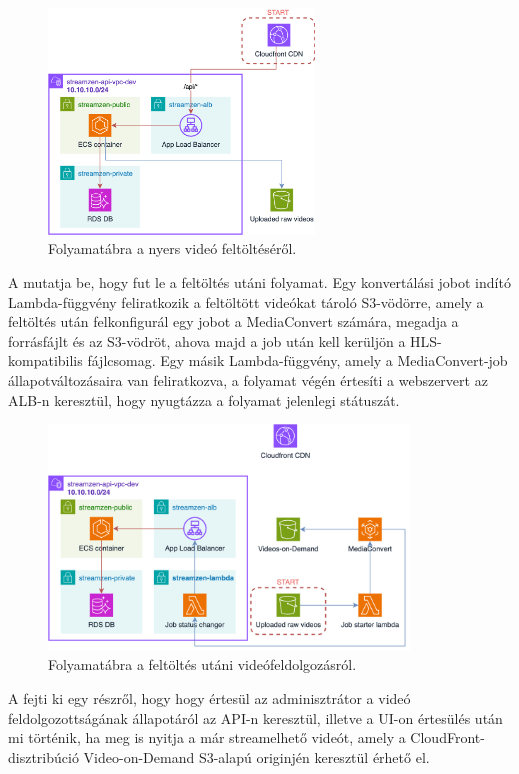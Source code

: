 \begin{figure}[]
	\centering
	\includegraphics[height=60mm, keepaspectratio]{figures/dipterv_vod1.png}
	\caption{Folyamatábra a nyers videó feltöltéséről.}
	\label{fig:vod1}
\end{figure}

A  mutatja be, hogy fut le a feltöltés utáni folyamat. Egy konvertálási jobot indító Lambda-függvény feliratkozik a feltöltött videókat tároló S3-vödörre, amely a feltöltés után felkonfigurál egy jobot a MediaConvert számára, megadja a forrásfájlt és az S3-vödröt, ahova majd a job után kell kerüljön a HLS-kompatibilis fájlcsomag. Egy másik Lambda-függvény, amely a MediaConvert-job állapotváltozásaira van feliratkozva, a folyamat végén értesíti a webszervert az ALB-n keresztül, hogy nyugtázza a folyamat jelenlegi státuszát.

\begin{figure}[]
	\centering
	\includegraphics[height=60mm, keepaspectratio]{figures/dipterv_vod2.png}
	\caption{Folyamatábra a feltöltés utáni videófeldolgozásról.}
	\label{fig:vod2}
\end{figure}

A  fejti ki egy részről, hogy hogy értesül az adminisztrátor a videó feldolgozottságának állapotáról az API-n keresztül, illetve a UI-on értesülés után mi történik, ha meg is nyitja a már streamelhető videót, amely a CloudFront-disztribúció Video-on-Demand S3-alapú originjén keresztül érhető el.

